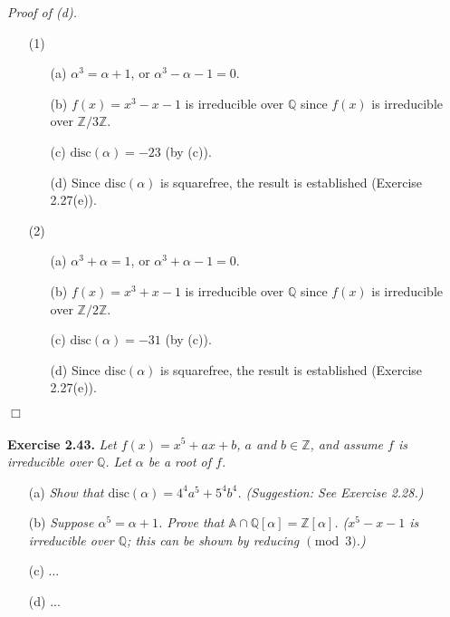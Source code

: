 \documentclass{article}
\begin{document}
\emph{Proof of (d).}
\begin{enumerate}
\item[(1)]
  \begin{enumerate}
  \item[(a)]
  $\alpha^3 = \alpha + 1$, or $\alpha^3 - \alpha - 1 = 0$.
  \item[(b)]
  $f(x) = x^3 - x - 1$ is irreducible over $\mathbb{Q}$
  since $f(x)$ is irreducible over $\mathbb{Z}/3\mathbb{Z}$.
  \item[(c)]
  $\text{disc}(\alpha) = -23$ (by (c)).
  \item[(d)]
  Since $\text{disc}(\alpha)$ is squarefree,
  the result is established (Exercise 2.27(e)).
  \end{enumerate}
\item[(2)]
  \begin{enumerate}
  \item[(a)]
  $\alpha^3 + \alpha = 1$, or $\alpha^3 + \alpha - 1 = 0$.
  \item[(b)]
  $f(x) = x^3 + x - 1$ is irreducible over $\mathbb{Q}$
  since $f(x)$ is irreducible over $\mathbb{Z}/2\mathbb{Z}$.
  \item[(c)]
  $\text{disc}(\alpha) = -31$ (by (c)).
  \item[(d)]
  Since $\text{disc}(\alpha)$ is squarefree,
  the result is established (Exercise 2.27(e)).
 \end{enumerate}
\end{enumerate}
$\Box$ \\\\






\textbf{Exercise 2.43.}
\emph{Let $f(x) = x^5+ax+b$, $a$ and $b \in \mathbb{Z}$,
and assume $f$ is irreducible over $\mathbb{Q}$.
Let $\alpha$ be a root of $f$.}
\begin{enumerate}
\item[(a)]
\emph{Show that $\text{disc}(\alpha) = 4^4 a^5 + 5^4 b^4$. (Suggestion: See Exercise 2.28.)}
\item[(b)]
\emph{Suppose $\alpha^5=\alpha+1$.
Prove that $\mathbb{A}\cap\mathbb{Q}[\alpha] = \mathbb{Z}[\alpha]$.
($x^5 - x - 1$ is irreducible over $\mathbb{Q}$;
this can be shown by reducing $\pmod{3}$.)}
\item[(c)]
...
\item[(d)]
... \\
\end{enumerate}
\end{document}
